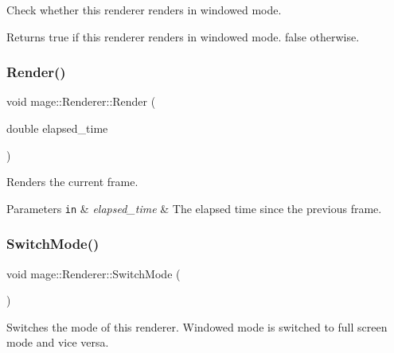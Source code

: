 Check whether this renderer renders in windowed mode.

\begin{DoxyReturn}{Returns}
{\ttfamily true} if this renderer renders in windowed mode. {\ttfamily false} otherwise. 
\end{DoxyReturn}
\hypertarget{classmage_1_1_renderer_a95ac55eb4cc79a5712a50bfb78f67fe6}{}\label{classmage_1_1_renderer_a95ac55eb4cc79a5712a50bfb78f67fe6} 
\subsubsection{\texorpdfstring{Render()}{Render()}}
{\footnotesize\ttfamily void mage\+::\+Renderer\+::\+Render (\begin{DoxyParamCaption}\item[{double}]{elapsed\+\_\+time }\end{DoxyParamCaption})\hspace{0.3cm}{\ttfamily [protected]}}

Renders the current frame.


\begin{DoxyParams}[1]{Parameters}
\mbox{\tt in}  & {\em elapsed\+\_\+time} & The elapsed time since the previous frame. \\
\hline
\end{DoxyParams}
\hypertarget{classmage_1_1_renderer_affae177123ead5eb15b2fb5957d5651e}{}\label{classmage_1_1_renderer_affae177123ead5eb15b2fb5957d5651e} 
\subsubsection{\texorpdfstring{Switch\+Mode()}{SwitchMode()}}
{\footnotesize\ttfamily void mage\+::\+Renderer\+::\+Switch\+Mode (\begin{DoxyParamCaption}{ }\end{DoxyParamCaption})}

Switches the mode of this renderer. Windowed mode is switched to full screen mode and vice versa. \hypertarget{classmage_1_1_renderer_ace70af3597f8b8f82c1c36a94c065b50}{}\label{classmage_1_1_renderer_ace70af3597f8b8f82c1c36a94c065b50} 
